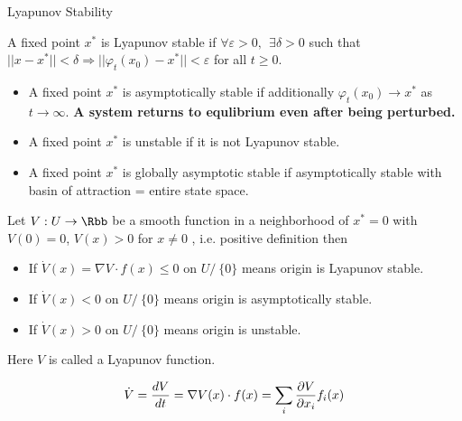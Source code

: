 \documentclass[aspectratio=169,xcolor=dvipsnames,svgnames,x11names,fleqn]{beamer}
\begin{document}
\begin{frame}{Lyapunov Stability}

        \scriptsize

    A fixed point $x^*$ is Lyapunov stable if $\forall \varepsilon > 0,~~ \exists \delta > 0$ such that $ || x - x^* || < \delta \Rightarrow || \varphi_t(x_0) - x^* || < \varepsilon$ for all $t \geq0 $. 

    \begin{itemize}
        \item A fixed point $x^*$ is asymptotically stable if additionally $\varphi_t(x_0) \to x^*$ as $t \to \infty$. \textbf{A system returns to equlibrium even after being perturbed.} 
        \item  A fixed point $x^*$ is unstable if it is not Lyapunov stable.
        \item  A fixed point $x^*$ is globally asymptotic stable if asymptotically stable with basin of attraction = entire state space.
    \end{itemize}

    \begin{tcolorbox}[title = Lyapunov's Direct Method]
        
        Let $V: U \to\Rbb$ be a smooth function in a neighborhood of $x^* = 0$ with $V(0) = 0$, $V(x) > 0$ for $x \neq 0$ , i.e. positive definition then

        \begin{itemize}
            \item If $\dot{V}(x) = \nabla V \cdot f(x) \leq 0$ on $U /\ \{ 0 \}$ means origin is Lyapunov stable.
            \item If $\dot{V}(x) < 0$ on  $U /\ \{ 0 \}$ means origin is asymptotically stable.
            \item If $\dot{V}(x) > 0$ on  $U /\ \{ 0 \}$ means origin is unstable.
        \end{itemize}

        Here $V$ is called a Lyapunov function.

   

                \begin{tcolorbox}[
                enhanced,
                rounded corners,
                boxrule=0.5pt, 
                bottomrule=2mm, 
                rightrule = 2mm,
                colframe=white!80!blue,
                colback=WarmWhite,
                notitle,
                left=1mm ]

                $$
                \dot{V} = \frac{dV}{dt} = \nabla V(x) \cdot f(x) = \sum_i \pdv{V}{x_i} f_i(x)
                $$
                \end{tcolorbox}
    \end{tcolorbox}    
\end{frame}
\end{document}

